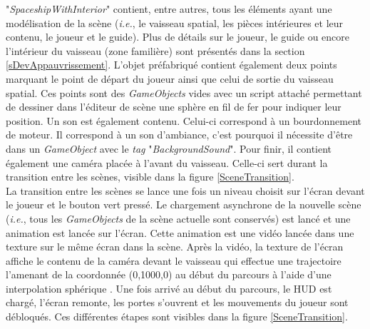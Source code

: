 		"\textit{SpaceshipWithInterior}" contient, entre autres, tous les éléments ayant une modélisation de la scène (\textit{i.e.}, le vaisseau spatial, les pièces intérieures et leur contenu, le joueur et le guide). Plus de détails sur le joueur, le guide ou encore l'intérieur du vaisseau (zone familière) sont présentés dans la section \ref{sDevAppauvrissement}. L'objet préfabriqué contient également deux points marquant le point de départ du joueur ainsi que celui de sortie du vaisseau spatial. Ces points sont des \textit{GameObjects} vides avec un script attaché permettant de dessiner dans l'éditeur de scène une sphère en fil de fer pour indiquer leur position. Un son est également contenu. Celui-ci correspond à un bourdonnement de moteur. Il correspond à un son d'ambiance, c'est pourquoi il nécessite d'être dans un \textit{GameObject} avec le \textit{tag} "\textit{BackgroundSound}". Pour finir, il contient également une caméra placée à l'avant du vaisseau. Celle-ci sert durant la transition entre les scènes, visible dans la figure \ref{SceneTransition}.
		\\
	
		La transition entre les scènes se lance une fois un niveau choisit sur l'écran devant le joueur et le bouton vert pressé. Le chargement asynchrone de la nouvelle scène (\textit{i.e.}, tous les \textit{GameObjects} de la scène actuelle sont conservés) est lancé et une animation est lancée sur l'écran. Cette animation est une vidéo lancée dans une texture sur le même écran dans la scène. Après la vidéo, la texture de l'écran affiche le contenu de la caméra devant le vaisseau qui effectue une trajectoire l'amenant de la coordonnée (0,1000,0) au début du parcours à l'aide d'une interpolation sphérique \cite{UnityVector3Slerp}. Une fois arrivé au début du parcours, le HUD est chargé, l'écran remonte, les portes s'ouvrent et les mouvements du joueur sont débloqués. Ces différentes étapes sont visibles dans la figure \ref{SceneTransition}.\medskip%
		
		\begin{minipage}{\linewidth}
			\label{SceneTransition}
		\end{minipage}\medskip
		\\	
	
